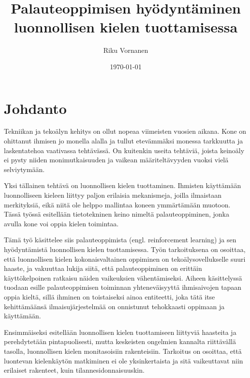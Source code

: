 \documentclass[finnish]{tktltiki2}
\title{Palauteoppimisen hyödyntäminen luonnollisen kielen tuottamisessa}
\author{Riku Vornanen}
\date{\today}
\theoremstyle{definition}
\theoremstyle{remark}
\begin{document}

\frontmatter      %

\maketitle        %
\makeabstract     %

\tableofcontents  %


\mainmatter       %

\section{Johdanto}

Tekniikan ja tekoälyn kehitys on ollut nopeaa viimeisten vuosien aikana. Kone on ohittanut ihmisen jo monella alalla ja tullut etevämmäksi monessa tarkkuutta ja laskentatehoa vaativassa tehtävässä. On kuitenkin useita tehtäviä, joista keinoäly ei pysty niiden monimutkaisuuden ja vaikean määriteltävyyden vuoksi vielä selviytymään.

Yksi tällainen tehtävä on luonnollisen kielen tuottaminen. Ihmisten käyttämään luonnolliseen kieleen liittyy paljon erilaisia mekanismeja, joilla ilmaistaan merkityksiä, eikä niitä ole helppo mallintaa koneen ymmärtämään muotoon. Tässä työssä esitellään tietotekninen keino nimeltä palauteoppiminen, jonka avulla kone voi oppia kielen toimintaa.

Tämä työ käsittelee siis palauteoppimista (engl. reinforcement learning) ja sen hyödyntämistä luonnollisen kielen tuottamisessa. Työn tarkoituksena on osoittaa, että luonnollisen kielen kokonaisvaltainen oppiminen on tekoälysovellukselle suuri haaste, ja vakuuttaa lukija siitä, että palauteoppiminen on erittäin käyttökelpoinen ratkaisu näiden vaikeuksien vähentämiseksi. Aiheen käsittelyssä tuodaan esille palauteoppimisen toiminnan yhteneväisyyttä ihmisaivojen tapaan oppia kieltä, sillä ihminen on toistaiseksi ainoa entiteetti, joka tätä itse kehittämäänsä ilmaisujärjestelmää on onnistunut tehokkaasti oppimaan ja käyttämään.

Ensimmäiseksi esitellään luonnollisen kielen tuottamiseen liittyviä haasteita ja perehdytetään pintapuolisesti, mutta keskeisten ongelmien kannalta riittävällä tasolla, luonnollisen kielen monitasoisiin rakenteisiin. Tarkoitus on osoittaa, että luontevan kielenkäytön matkiminen ei ole yksinkertaista ja sitä vaikeuttavat niin erilaiset rakenteet, kuin tilannesidonnaisuuskin.
\end{document}
